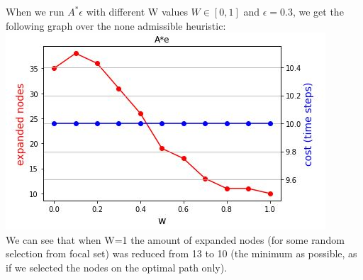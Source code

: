 \documentclass[12pt]{article}
\begin{document}
When we run $A^*\epsilon$ with different W values $W\in[0,1]$ and $\epsilon = 0.3$, we get the following graph over the none admissible heuristic:\\
\includegraphics[scale=1]{hw1/w_graph_more_accurate.JPG}\\

We can see that when W=1 the amount of expanded nodes (for some random selection from focal set) was reduced from 13 to 10 (the minimum as possible, as if we selected the nodes on the optimal path only).
\end{document}

